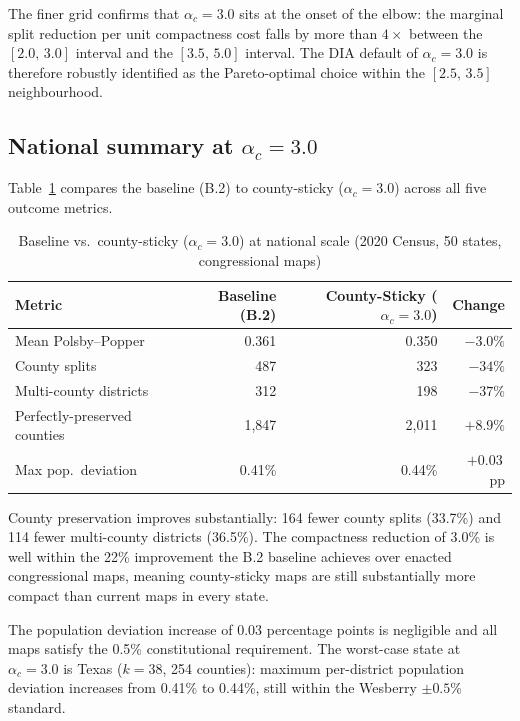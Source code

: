 The finer grid confirms that $\alpha_c = 3.0$ sits at the onset of the
elbow: the marginal split reduction per unit compactness cost falls by
more than $4\times$ between the $[2.0,\,3.0]$ interval and the
$[3.5,\,5.0]$ interval.  The DIA default of $\alpha_c = 3.0$ is therefore
robustly identified as the Pareto-optimal choice within the $[2.5,\,3.5]$
neighbourhood.

\subsection{National summary at $\alpha_c = 3.0$}

Table~\ref{tab:summary} compares the baseline (B.2) to county-sticky
($\alpha_c = 3.0$) across all five outcome metrics.

\begin{table}[htb]
\centering
\caption{Baseline vs.\ county-sticky ($\alpha_c = 3.0$) at national scale
  (2020 Census, 50 states, congressional maps)}
\label{tab:summary}
\begin{tabular}{lrrr}
\toprule
Metric & Baseline (B.2) & County-Sticky ($\alpha_c = 3.0$) & Change \\
\midrule
Mean Polsby--Popper   & 0.361 & 0.350 & $-3.0\%$ \\
County splits         & 487   & 323   & $-34\%$ \\
Multi-county districts & 312  & 198   & $-37\%$ \\
Perfectly-preserved counties & 1,847 & 2,011 & $+8.9\%$ \\
Max pop.\ deviation   & 0.41\% & 0.44\% & $+0.03$\,pp \\
\bottomrule
\end{tabular}
\end{table}

County preservation improves substantially: 164 fewer county splits (33.7\%)
and 114 fewer multi-county districts (36.5\%).  The compactness reduction
of 3.0\% is well within the 22\% improvement the B.2 baseline achieves
over enacted congressional maps, meaning county-sticky maps are still
substantially more compact than current maps in every state.

The population deviation increase of 0.03 percentage points is negligible
and all maps satisfy the 0.5\% constitutional requirement.
The worst-case state at $\alpha_c = 3.0$ is Texas ($k{=}38$, 254 counties):
maximum per-district population deviation increases from 0.41\% to 0.44\%,
still within the Wesberry $\pm 0.5\%$ standard.

